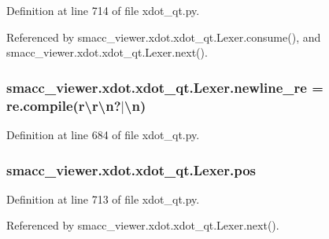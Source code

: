 Definition at line 714 of file xdot\+\_\+qt.\+py.



Referenced by smacc\+\_\+viewer.\+xdot.\+xdot\+\_\+qt.\+Lexer.\+consume(), and smacc\+\_\+viewer.\+xdot.\+xdot\+\_\+qt.\+Lexer.\+next().

\subsubsection[{\texorpdfstring{newline\+\_\+re}{newline_re}}]{\setlength{\rightskip}{0pt plus 5cm}smacc\+\_\+viewer.\+xdot.\+xdot\+\_\+qt.\+Lexer.\+newline\+\_\+re = re.\+compile(r\textquotesingle{}\textbackslash{}r\textbackslash{}n?$\vert$\textbackslash{}n\textquotesingle{})\hspace{0.3cm}{\ttfamily [static]}}\hypertarget{classsmacc__viewer_1_1xdot_1_1xdot__qt_1_1Lexer_a1692a3d1570e72a945946242edd0f7e9}{}\label{classsmacc__viewer_1_1xdot_1_1xdot__qt_1_1Lexer_a1692a3d1570e72a945946242edd0f7e9}


Definition at line 684 of file xdot\+\_\+qt.\+py.

\subsubsection[{\texorpdfstring{pos}{pos}}]{\setlength{\rightskip}{0pt plus 5cm}smacc\+\_\+viewer.\+xdot.\+xdot\+\_\+qt.\+Lexer.\+pos}\hypertarget{classsmacc__viewer_1_1xdot_1_1xdot__qt_1_1Lexer_a091be9759b62e2a485ea9538b429b453}{}\label{classsmacc__viewer_1_1xdot_1_1xdot__qt_1_1Lexer_a091be9759b62e2a485ea9538b429b453}


Definition at line 713 of file xdot\+\_\+qt.\+py.



Referenced by smacc\+\_\+viewer.\+xdot.\+xdot\+\_\+qt.\+Lexer.\+next().

